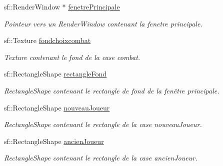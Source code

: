 \begin{DoxyCompactItemize}
\item 
\mbox{\label{class_s_f_m_l_charger_a22566e686e62fa3031d12579a30820c0}} 
sf\+::\+Render\+Window $\ast$ \hyperlink{class_s_f_m_l_charger_a22566e686e62fa3031d12579a30820c0}{fenetre\+Principale}
\begin{DoxyCompactList}\small\item\em Pointeur vers un Render\+Window contenant la fenetre principale. \end{DoxyCompactList}\item 
\mbox{\label{class_s_f_m_l_charger_a855b7e89c52bed336a9c981b6ca21db0}} 
sf\+::\+Texture \hyperlink{class_s_f_m_l_charger_a855b7e89c52bed336a9c981b6ca21db0}{fondchoixcombat}
\begin{DoxyCompactList}\small\item\em Texture contenant le fond de la case combat. \end{DoxyCompactList}\item 
\mbox{\label{class_s_f_m_l_charger_a74d88d4ad823e52ed214986e6c093085}} 
sf\+::\+Rectangle\+Shape \hyperlink{class_s_f_m_l_charger_a74d88d4ad823e52ed214986e6c093085}{rectangle\+Fond}
\begin{DoxyCompactList}\small\item\em Rectangle\+Shape contenant le rectangle de fond de la fenêtre principale. \end{DoxyCompactList}\item 
\mbox{\label{class_s_f_m_l_charger_acdb6877e468dd982981ad3f930861315}} 
sf\+::\+Rectangle\+Shape \hyperlink{class_s_f_m_l_charger_acdb6877e468dd982981ad3f930861315}{nouveau\+Joueur}
\begin{DoxyCompactList}\small\item\em Rectangle\+Shape contenant le rectangle de la case nouveau\+Joueur. \end{DoxyCompactList}\item 
\mbox{\label{class_s_f_m_l_charger_a89dc19954372341f8bdb9df5b25a59ce}} 
sf\+::\+Rectangle\+Shape \hyperlink{class_s_f_m_l_charger_a89dc19954372341f8bdb9df5b25a59ce}{ancien\+Joueur}
\begin{DoxyCompactList}\small\item\em Rectangle\+Shape contenant le rectangle de la case ancien\+Joueur. \end{DoxyCompactList}\item 

\end{DoxyCompactItemize}
